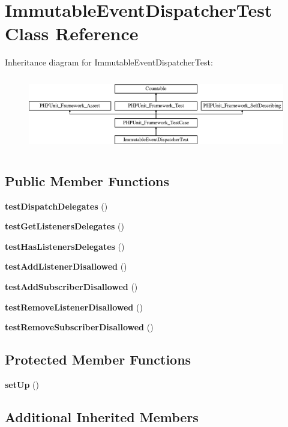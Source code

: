 \section{Immutable\+Event\+Dispatcher\+Test Class Reference}
\label{class_symfony_1_1_component_1_1_event_dispatcher_1_1_tests_1_1_immutable_event_dispatcher_test}
Inheritance diagram for Immutable\+Event\+Dispatcher\+Test\+:\begin{figure}[H]
\begin{center}
\leavevmode
\includegraphics[height=3.303835cm]{class_symfony_1_1_component_1_1_event_dispatcher_1_1_tests_1_1_immutable_event_dispatcher_test}
\end{center}
\end{figure}
\subsection*{Public Member Functions}
\begin{DoxyCompactItemize}
\item 
{\bf test\+Dispatch\+Delegates} ()
\item 
{\bf test\+Get\+Listeners\+Delegates} ()
\item 
{\bf test\+Has\+Listeners\+Delegates} ()
\item 
{\bf test\+Add\+Listener\+Disallowed} ()
\item 
{\bf test\+Add\+Subscriber\+Disallowed} ()
\item 
{\bf test\+Remove\+Listener\+Disallowed} ()
\item 
{\bf test\+Remove\+Subscriber\+Disallowed} ()
\end{DoxyCompactItemize}
\subsection*{Protected Member Functions}
\begin{DoxyCompactItemize}
\item 
{\bf set\+Up} ()
\end{DoxyCompactItemize}
\subsection*{Additional Inherited Members}


